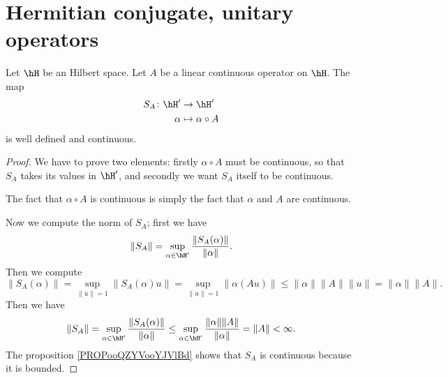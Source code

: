 \section{Hermitian conjugate, unitary operators}

\begin{lemma}
    Let \( \hH\) be an Hilbert space. Let \( A\) be a linear continuous operator on \( \hH\). The map
    \begin{equation}
        \begin{aligned}
            S_A\colon \hH'&\to \hH' \\
            \alpha&\mapsto \alpha\circ A
        \end{aligned}
    \end{equation}
    is well defined and continuous.
\end{lemma}

\begin{proof}
    We have to prove two elements: firstly \( \alpha\circ A\) must be continuous, so that \( S_A\) takes its values in \( \hH'\), and secondly we want \( S_A\) itself to be continuous.

    The fact that \( \alpha\circ A\) is continuous is simply the fact that \( \alpha\) and \( A\) are continuous.

    Now we compute the norm of \( S_A\); first we have
    \begin{equation}
        \| S_A \|=\sup_{\alpha\in \hH'}\frac{ \| S_A(\alpha) \| }{ \| \alpha \| }.
    \end{equation}
    Then we compute
    \begin{equation}
        \| S_A(\alpha) \|=\sup_{\| u \|=1}\| S_A(\alpha)u \|=\sup_{\| u \|=1}\| \alpha(Au) \|\leq \| \alpha \|\| A \|\| u \|=\| \alpha \|\| A \|.
    \end{equation}
    Then we have
    \begin{equation}
        \| S_A \|=\sup_{\alpha\in \hH'}\frac{ \| S_A(\alpha) \| }{ \| \alpha \| }\leq \sup_{\alpha\in \hH'}\frac{ \| \alpha \|\| A \| }{ \| \alpha \| }=\| A \|<\infty.
    \end{equation}
    The proposition \ref{PROPooQZYVooYJVlBd} shows that \( S_A \) is continuous because it is bounded.
\end{proof}

